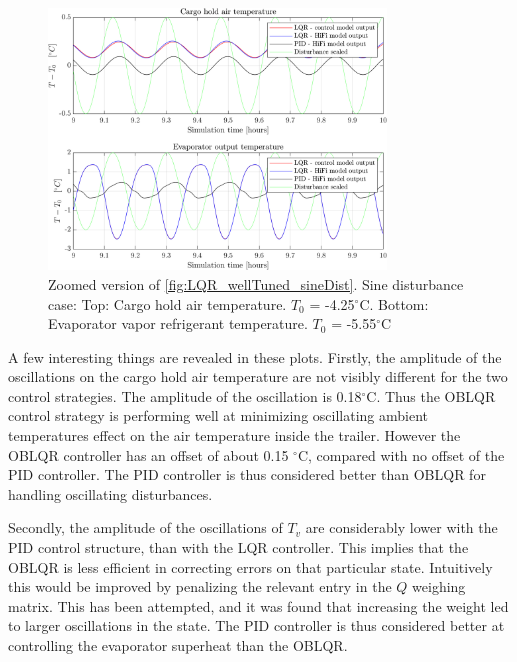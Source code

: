 \begin{figure}[H]
	\centering
	\includegraphics[width=0.8\textwidth]{Graphics/fig_LQRvsKresten_sineDist_zoom.png}
	\caption{Zoomed version of \cref{fig:LQR_wellTuned_sineDist}. Sine disturbance case: Top: Cargo hold air temperature. $T_0$ = -4.25$^{\circ}$C. Bottom: Evaporator vapor refrigerant temperature. $T_0$ = -5.55$^{\circ}$C}
	\label{fig:LQR_wellTuned_sineDist_zoom}
\end{figure}

\noindent A few interesting things are revealed in these plots. 
Firstly, the amplitude of the oscillations on the cargo hold air temperature are not visibly different for the two control strategies. The amplitude of the oscillation is 0.18$^{\circ}$C. Thus the OBLQR control strategy is performing well at minimizing oscillating ambient temperatures effect on the air temperature inside the trailer. However the OBLQR controller has an offset of about 0.15 $ ^{\circ} $C, compared with no offset of the PID controller. The PID controller is thus considered better than OBLQR for handling oscillating disturbances.

Secondly, the amplitude of the oscillations of $T_v$ are considerably lower with the PID control structure, than with the LQR controller. This implies that the OBLQR is less efficient in correcting errors on that particular state. Intuitively this would be improved by penalizing the relevant entry in the $Q$ weighing matrix. This has been attempted, and it was found that increasing the weight led to larger oscillations in the state. The PID controller is thus considered better at controlling the evaporator superheat than the OBLQR. \\

